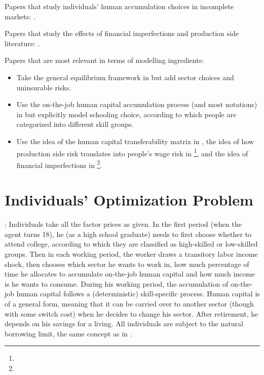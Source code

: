 \documentclass[12pt]{article}
\newcommand{\highlightR}[1]{{\color{MyRed}{#1}}}
\theoremstyle{definition}
\begin{document}
\begin{spacing}{1}
Papers that study individuals' human accumulation choices in incomplete markets: \citet{singh2010, krebs2003, park2018, huggett2011, stantcheva2017, huggett2006}.

Papers that study the effects of financial imperfections and production side literature: \citet{buera2011, angeletos2006, krusell2000, midrigan2014, song2011}.

Papers that are most relevant in terms of modelling ingredients:
\begin{itemize} 
	\setlength\itemsep{0em}
	\setlength{\parskip}{8pt} 
	\setlength{\topsep}{0em} 
	\item Take the general equilibrium framework in \citet{heckman1998} but add sector choices and uninsurable risks.
	\item Use the on-the-job human capital accumulation process (and most notations) in \citet{huggett2011} but explicitly model schooling choice, according to which people are categorized into different skill groups.
	\item Use the idea of the human capital transferability matrix in \citet{dvorkin2019}, the idea of how production side risk translates into people's wage risk in \citet{kambourov2009} \footnote{\highlightR{NOT SO SURE!}}, and the idea of financial imperfections in \citet{song2011}\footnote{\highlightR{NOT SO SURE!}}.
\end{itemize}


\section{Individuals' Optimization Problem} \label{sec:hh}

\highlightR{Overview of the Setup}:
Individuals take all the factor prices as given. In the first period (when the agent turns 18), he (as a high school graduate) needs to first choose whether to attend college, according to which they are classified as high-skilled or low-skilled groups. Then in each working period, the worker draws a transitory labor income shock, then chooses which sector he wants to work in, how much percentage of time he allocates to accumulate on-the-job human capital and how much income is he wants to consume. During his working period, the accumulation of on-the-job human capital follows a (deterministic) skill-specific process. Human capital is of a general form, meaning that it can be carried over to another sector (though with some switch cost) when he decides to change his sector. After retirement, he depends on his savings for a living. All individuals are subject to the natural borrowing limit, the same concept as in \citet{aiyagari1994}. 


\end{spacing}
\end{document}
